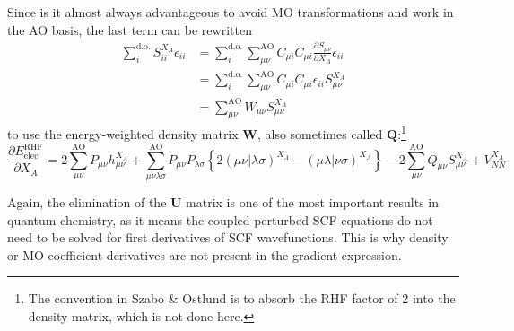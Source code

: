 \documentclass[%
class = book,%
crop = false,%
float = true,%
multi = true,%
preview = false,%
]{standalone}
\begin{document}
Since is it almost always advantageous to avoid MO transformations and work in the AO basis, the last term can be rewritten
\begin{equation}
  \tag{Yamaguchi eq. 4.24}
  \begin{aligned}
    \sum_{i}^{\text{d.o.}} S_{ii}^{X_{A}} \epsilon_{ii} &= \sum_{i}^{\text{d.o.}} \sum_{\mu\nu}^{\text{AO}} C_{\mu i} C_{\mu i} \frac{\partial S_{\mu\nu}}{\partial X_{A}} \epsilon_{ii} \\
    &= \sum_{i}^{\text{d.o.}} \sum_{\mu\nu}^{\text{AO}} C_{\mu i} C_{\mu i} \epsilon_{ii} S_{\mu\nu}^{X_{A}} \\
    &= \sum_{\mu\nu}^{\text{AO}} W_{\mu\nu} S_{\mu\nu}^{X_{A}}
  \end{aligned}
\end{equation}
to use the energy-weighted density matrix \(\mathbf{W}\), also sometimes called \(\mathbf{Q}\):\footnote{The convention in Szabo \& Ostlund is to absorb the RHF factor of 2 into the density matrix, which is not done here.}
\begin{equation}
  \label{eq:szabo-c12}
  \tag{Szabo \& Ostlund eq. C.12}
  \frac{\partial E_{\text{elec}}^{\text{RHF}}}{\partial X_{A}} = 2 \sum_{\mu\nu}^{\text{AO}} P_{\mu\nu} h_{\mu\nu}^{X_{A}} + \sum_{\mu\nu\lambda\sigma}^{\text{AO}} P_{\mu\nu}P_{\lambda\sigma} \left\{ 2(\mu\nu|\lambda\sigma)^{X_{A}} - (\mu\lambda|\nu\sigma)^{X_{A}} \right\} - 2 \sum_{\mu\nu}^{\text{AO}} Q_{\mu\nu} S_{\mu\nu}^{X_{A}} + V_{NN}^{X_{A}}
\end{equation}

Again, the elimination of the \(\mathbf{U}\) matrix is one of the most important results in quantum chemistry, as it means the coupled-perturbed SCF equations do not need to be solved for first derivatives of SCF wavefunctions. This is why density or MO coefficient derivatives are not present in the gradient expression.
\end{document}
